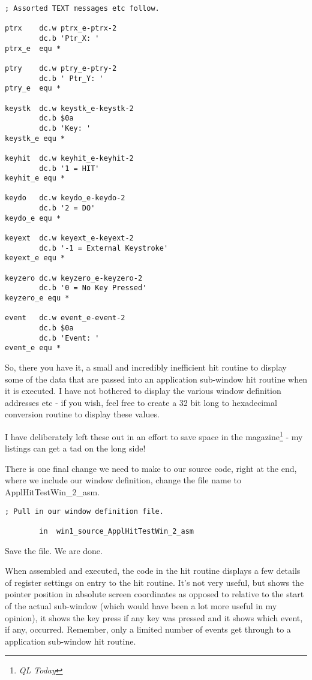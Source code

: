\begin{lstlisting}[firstnumber=1,]
; Assorted TEXT messages etc follow.

ptrx    dc.w ptrx_e-ptrx-2
        dc.b 'Ptr_X: '
ptrx_e  equ *

ptry    dc.w ptry_e-ptry-2
        dc.b ' Ptr_Y: '
ptry_e  equ *

keystk  dc.w keystk_e-keystk-2
        dc.b $0a
        dc.b 'Key: '
keystk_e equ *

keyhit  dc.w keyhit_e-keyhit-2
        dc.b '1 = HIT'
keyhit_e equ *

keydo   dc.w keydo_e-keydo-2
        dc.b '2 = DO'
keydo_e equ *

keyext  dc.w keyext_e-keyext-2
        dc.b '-1 = External Keystroke'
keyext_e equ *

keyzero dc.w keyzero_e-keyzero-2
        dc.b '0 = No Key Pressed'
keyzero_e equ *

event   dc.w event_e-event-2
        dc.b $0a
        dc.b 'Event: '
event_e equ *
\end{lstlisting}

So, there you have it, a small and incredibly inefficient hit routine to
        display some of the data that are passed into an application sub-{}window hit
        routine when it is executed. I have not bothered to display the various window
        definition addresses etc -{} if you wish, feel free to create a 32 bit long to
        hexadecimal conversion routine to display these values.

I have deliberately left these out in an effort to save space in the
        magazine\footnote{\emph{QL Today}} -{} my listings can get a tad on the long side!

There is one final change we need to make to our source code, right at the
        end, where we include our window definition, change the file name to
 ApplHitTestWin\_2\_asm.

\begin{lstlisting}[firstnumber=1,]
; Pull in our window definition file.

        in  win1_source_ApplHitTestWin_2_asm
\end{lstlisting}

Save the file. We are done.

When assembled and executed, the code in the hit routine displays a few
        details of register settings on entry to the hit routine. It's not very useful,
        but shows the pointer position in absolute screen coordinates as opposed to
        relative to the start of the actual sub-{}window (which would have been a lot more
        useful in my opinion), it shows the key press if any key was pressed and it shows
        which event, if any, occurred. Remember, only a limited number of events get
        through to a application sub-{}window hit routine.

